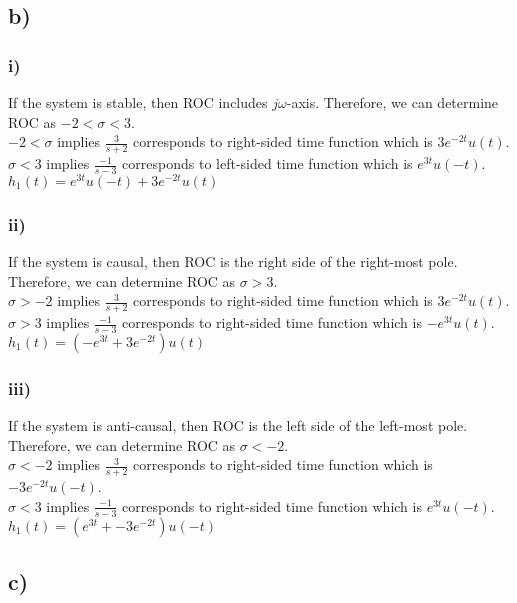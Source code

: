 \documentclass[12pt]{article}
\begin{document}
    \subsection*{b)}
    \subsubsection*{i)} 
    If the system is stable, then ROC includes \(j\omega\)-axis. Therefore, we can determine ROC as \(-2 < \sigma < 3\).\\
    \(-2 < \sigma\) implies \(\frac{3}{s+2}\) corresponds to right-sided time function which is \(3e^{-2t}u(t)\).\\
    \(\sigma < 3\) implies \(\frac{-1}{s-3}\) corresponds to left-sided time function which is \(e^{3t}u(-t)\).\\
    \(h_1(t) = e^{3t}u(-t) + 3e^{-2t}u(t)\)      

    \subsubsection*{ii)}
    If the system is causal, then ROC is the right side of the right-most pole. Therefore, we can determine ROC as \(\sigma > 3\).\\
    \(\sigma > -2\) implies \(\frac{3}{s+2}\) corresponds to right-sided time function which is \(3e^{-2t}u(t)\).\\
    \(\sigma > 3\) implies \(\frac{-1}{s-3}\) corresponds to right-sided time function which is \(-e^{3t}u(t)\).\\
    \(h_1(t) = (-e^{3t} + 3e^{-2t})u(t)\) 
    
    \subsubsection*{iii)}
    If the system is anti-causal, then ROC is the left side of the left-most pole. Therefore, we can determine ROC as \(\sigma < -2\).\\
    \(\sigma < -2\) implies \(\frac{3}{s+2}\) corresponds to right-sided time function which is \(-3e^{-2t}u(-t)\).\\
    \(\sigma < 3\) implies \(\frac{-1}{s-3}\) corresponds to right-sided time function which is \(e^{3t}u(-t)\).\\
    \(h_1(t) = (e^{3t} + -3e^{-2t})u(-t)\) 
    
    \subsection*{c)}
\end{document}
